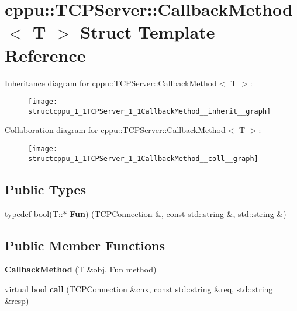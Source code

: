 \hypertarget{structcppu_1_1TCPServer_1_1CallbackMethod}{}\section{cppu\+:\+:T\+C\+P\+Server\+:\+:Callback\+Method$<$ T $>$ Struct Template Reference}
\label{structcppu_1_1TCPServer_1_1CallbackMethod}


Inheritance diagram for cppu\+:\+:T\+C\+P\+Server\+:\+:Callback\+Method$<$ T $>$\+:
\nopagebreak
\begin{figure}[H]
\begin{center}
\leavevmode
\texttt{[image: structcppu\_1\_1TCPServer\_1\_1CallbackMethod\_\_inherit\_\_graph]}
\end{center}
\end{figure}


Collaboration diagram for cppu\+:\+:T\+C\+P\+Server\+:\+:Callback\+Method$<$ T $>$\+:
\nopagebreak
\begin{figure}[H]
\begin{center}
\leavevmode
\texttt{[image: structcppu\_1\_1TCPServer\_1\_1CallbackMethod\_\_coll\_\_graph]}
\end{center}
\end{figure}
\subsection*{Public Types}
\begin{DoxyCompactItemize}
\item 
\hypertarget{structcppu_1_1TCPServer_1_1CallbackMethod_a6f71d878bd072aadf40d96d1db18eecd}{}typedef bool(T\+::$\ast$ {\bfseries Fun}) (\hyperlink{classcppu_1_1TCPConnection}{T\+C\+P\+Connection} \&, const std\+::string \&, std\+::string \&)\label{structcppu_1_1TCPServer_1_1CallbackMethod_a6f71d878bd072aadf40d96d1db18eecd}

\end{DoxyCompactItemize}
\subsection*{Public Member Functions}
\begin{DoxyCompactItemize}
\item 
\hypertarget{structcppu_1_1TCPServer_1_1CallbackMethod_a0c6ceee6db8c67ef56fb26d1df52140f}{}{\bfseries Callback\+Method} (T \&obj, Fun method)\label{structcppu_1_1TCPServer_1_1CallbackMethod_a0c6ceee6db8c67ef56fb26d1df52140f}

\item 
\hypertarget{structcppu_1_1TCPServer_1_1CallbackMethod_a0c11039d0ed983c03a614d0764df3793}{}virtual bool {\bfseries call} (\hyperlink{classcppu_1_1TCPConnection}{T\+C\+P\+Connection} \&cnx, const std\+::string \&req, std\+::string \&resp)\label{structcppu_1_1TCPServer_1_1CallbackMethod_a0c11039d0ed983c03a614d0764df3793}

\end{DoxyCompactItemize}
